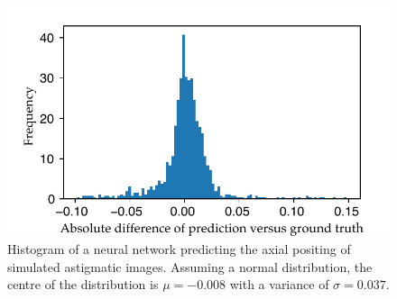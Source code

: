 \begin{figure}
    \centering
    \includegraphics{nn_cont_astig}
    \caption[Histogram of a neural network predicting the axial positing of simulated astigmatic images.]{
    Histogram of a neural network predicting the axial positing of simulated astigmatic images.
    Assuming a normal distribution, the centre of the distribution is \(\mu=-0.008\) with a variance of \(\sigma=0.037\).
    }\label{fig:nn_cont_astig}
\end{figure}


